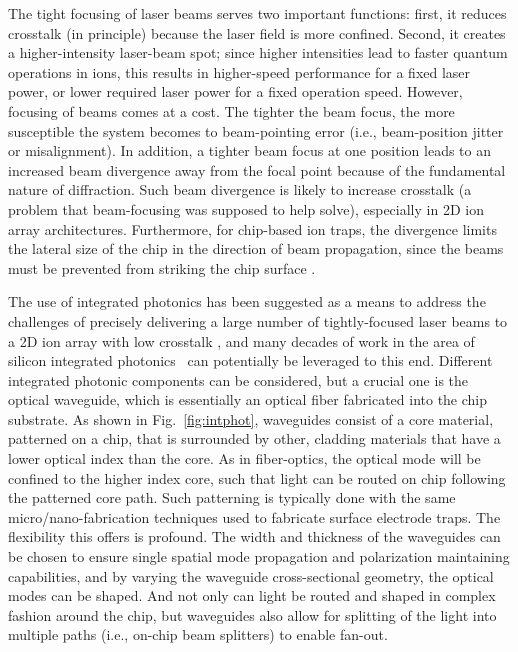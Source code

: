 \documentclass[%
12pt,
 amsmath,amssymb,
]{revtex4-2}
\begin{document}
The tight focusing of laser beams serves two important functions: first, it reduces crosstalk (in principle) because the laser field is more confined.  Second, it creates a higher-intensity laser-beam spot; since higher intensities lead to faster quantum operations in ions, this results in higher-speed performance for a fixed laser power, or lower required laser power for a fixed operation speed.  However, focusing of beams comes at a cost.  The tighter the beam focus, the more susceptible the system becomes to beam-pointing error (i.e., beam-position jitter or  misalignment).  In addition, a tighter beam focus at one position leads to an increased beam divergence away from the focal point because of the fundamental nature of diffraction.  Such beam divergence is likely to increase crosstalk (a problem that beam-focusing was supposed to help solve), especially in 2D ion array architectures.  Furthermore, for chip-based ion traps, the divergence limits the lateral size of the chip in the direction of beam propagation, since the beams must be prevented from striking the chip surface \cite{BrownCodesign2016, GuiseBallGrid2015}.

The use of integrated photonics has been suggested as a means to address the challenges of precisely delivering a large number of tightly-focused laser beams to a 2D ion array with low crosstalk \cite{KielpinskiIntPhotonArch2016, MehtaIntegrated2016,MehtaThesis2017}, and many decades of work in the area of silicon integrated photonics~\cite{ThomsonSiPhotonicsReview2016} can potentially be leveraged to this end.  Different integrated photonic components can be considered, but a crucial one is the optical waveguide, which is essentially an optical fiber fabricated into the chip substrate.  As shown in Fig.~\ref{fig:intphot}, waveguides consist of a core material, patterned on a chip, that is surrounded by other, cladding materials that have a lower optical index than the core.  As in fiber-optics, the optical mode will be confined to the higher index core, such that light can be routed on chip following the patterned core path.  Such patterning is typically done with the same micro/nano-fabrication techniques used to fabricate surface electrode traps.   The flexibility this offers is profound.  The width and thickness of the waveguides can be chosen to ensure single spatial mode propagation and polarization maintaining capabilities, and by varying the waveguide cross-sectional geometry, the optical modes can be shaped. And not only can light be routed and shaped in complex fashion around the chip, but waveguides also allow for splitting of the light into multiple paths (i.e., on-chip beam splitters) to enable fan-out.
\end{document}

